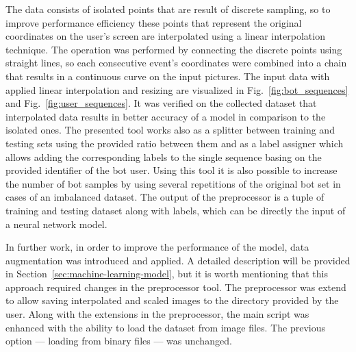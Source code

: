 The data consists of isolated points that are result of discrete sampling, so to improve performance efficiency these points that represent the original coordinates on the user's screen are interpolated using a linear interpolation technique.
The operation was performed by connecting the discrete points using straight lines, so each consecutive event's coordinates were combined into a chain that results in a continuous curve on the input pictures.
The input data with applied linear interpolation and resizing are visualized in Fig.~\ref{fig:bot_sequences} and Fig.~\ref{fig:user_sequences}.
It was verified on the collected dataset that interpolated data results in better accuracy of a model in comparison to the isolated ones.
The presented tool works also as a splitter between training and testing sets using the provided ratio between them and as a label assigner which allows adding the corresponding labels to the single sequence basing on the provided identifier of the bot user.
Using this tool it is also possible to increase the number of bot samples by using several repetitions of the original bot set in cases of an imbalanced dataset.
The output of the preprocessor is a tuple of training and testing dataset along with labels, which can be directly the input of a neural network model.

In further work, in order to improve the performance of the model, data augmentation was introduced and applied.
A detailed description will be provided in Section~\ref{sec:machine-learning-model}, but it is worth mentioning that this approach required changes in the preprocessor tool.
The preprocessor was extend to allow saving interpolated and scaled images to the directory provided by the user.
Along with the extensions in the preprocessor, the main script was enhanced with the ability to load the dataset from image files.
The previous option --- loading from binary files --- was unchanged.